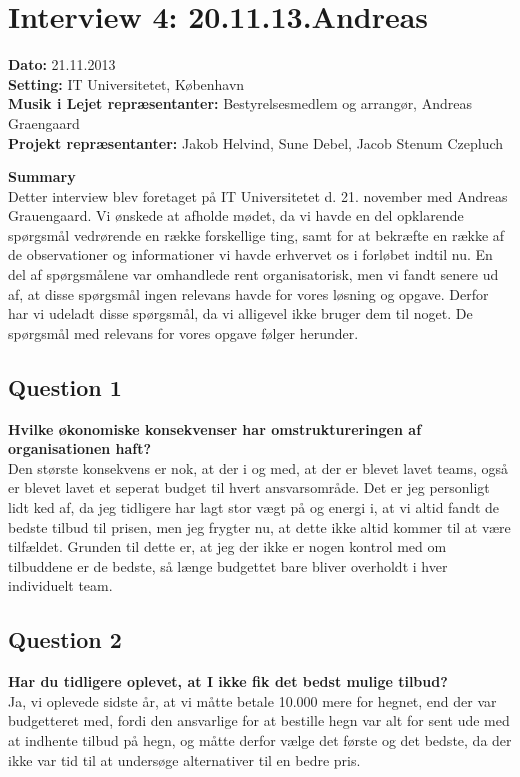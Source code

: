 \section{Interview 4: 20.11.13.Andreas}
\label{sec:interview_4}

\textbf{Dato:} 21.11.2013 \\
\textbf{Setting:} IT Universitetet, København \\
\textbf{Musik i Lejet repræsentanter:} Bestyrelsesmedlem og arrangør, Andreas Graengaard  \\
\textbf{Projekt repræsentanter:} Jakob Helvind, Sune Debel, Jacob Stenum Czepluch

\bigskip

\noindent \textbf{Summary} \\
Detter interview blev foretaget på IT Universitetet d. 21. november med Andreas Grauengaard. Vi ønskede at afholde mødet, da vi havde en del opklarende spørgsmål vedrørende en række forskellige ting, samt for at bekræfte en række af de observationer og informationer vi havde erhvervet os i forløbet indtil nu. En del af spørgsmålene var omhandlede \mil rent organisatorisk, men vi fandt senere ud af, at disse spørgsmål ingen relevans havde for vores løsning og opgave. Derfor har vi udeladt disse spørgsmål, da vi alligevel ikke bruger dem til noget. De spørgsmål med relevans for
vores opgave følger herunder.

\subsection{Question 1}
\label{sub:i4q1}
\noindent \textbf{Hvilke økonomiske konsekvenser har omstruktureringen af organisationen haft?} 
\\
Den største konsekvens er nok, at der i og med, at der er blevet lavet teams, også er blevet lavet
et seperat budget til hvert ansvarsområde. Det er jeg personligt lidt ked af, da jeg tidligere har
lagt stor vægt på og energi i, at vi altid fandt de bedste tilbud til prisen, men jeg frygter nu, at
dette ikke altid kommer til at være tilfældet. Grunden til dette er, at jeg der ikke er nogen
kontrol med om tilbuddene er de bedste, så længe budgettet bare bliver overholdt i hver individuelt
team.

\subsection{Question 2}
\label{sub:i4q2}
\noindent \textbf{Har du tidligere oplevet, at I ikke fik det bedst mulige tilbud?}
\\
Ja, vi oplevede sidste år, at vi måtte betale 10.000 mere for hegnet, end der var budgetteret med,
fordi den ansvarlige for at bestille hegn var alt for sent ude med at indhente tilbud på hegn, og
måtte derfor vælge det første og det bedste, da der ikke var tid til at undersøge alternativer til
en bedre pris.

